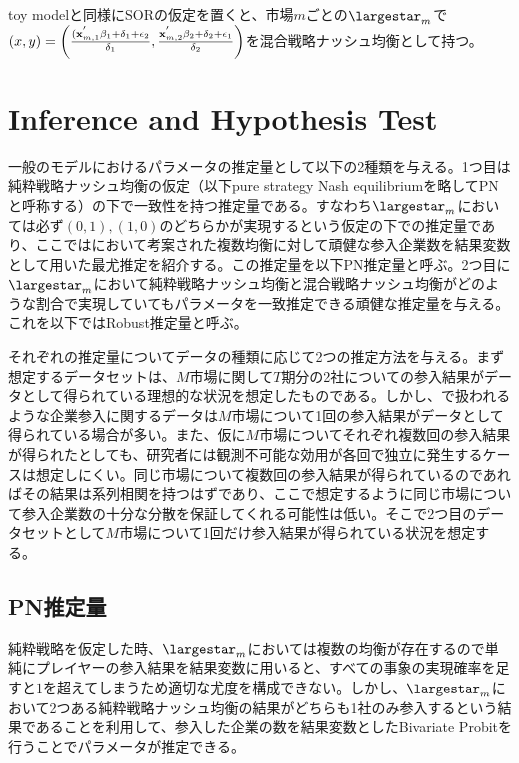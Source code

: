 \documentclass{jsarticle}
\begin{document}
toy modelと同様にSORの仮定を置くと、市場$m$ごとの$\largestar_m$で$(x, y) = \left( \frac{({\bf x}_{m, 1}^{'} \beta_1 + \delta_1 + \epsilon_2}{\delta_1} ,  \frac{{\bf x}_{m, 2}^{'} \beta_2 + \delta_2 + \epsilon_1}{\delta_2} \right)$を混合戦略ナッシュ均衡として持つ。


\section{Inference and Hypothesis Test}
一般のモデルにおけるパラメータの推定量として以下の2種類を与える。1つ目は純粋戦略ナッシュ均衡の仮定（以下pure strategy Nash equilibriumを略してPNと呼称する）の下で一致性を持つ推定量である。すなわち$\largestar_m$においては必ず$(0,1), (1,0)$のどちらかが実現するという仮定の下での推定量であり、ここでは\cite{Bresnahan1991}において考案された複数均衡に対して頑健な参入企業数を結果変数として用いた最尤推定を紹介する。この推定量を以下PN推定量と呼ぶ。2つ目に$\largestar_m$において純粋戦略ナッシュ均衡と混合戦略ナッシュ均衡がどのような割合で実現していてもパラメータを一致推定できる頑健な推定量を与える。これを以下ではRobust推定量と呼ぶ。

それぞれの推定量についてデータの種類に応じて2つの推定方法を与える。まず想定するデータセットは、$M$市場に関して$T$期分の2社についての参入結果がデータとして得られている理想的な状況を想定したものである。しかし、\cite{Ciliberto2009a}で扱われるような企業参入に関するデータは$M$市場について1回の参入結果がデータとして得られている場合が多い。また、仮に$M$市場についてそれぞれ複数回の参入結果が得られたとしても、研究者には観測不可能な効用が各回で独立に発生するケースは想定しにくい。同じ市場について複数回の参入結果が得られているのであればその結果は系列相関を持つはずであり、ここで想定するように同じ市場について参入企業数の十分な分散を保証してくれる可能性は低い。そこで2つ目のデータセットとして$M$市場について1回だけ参入結果が得られている状況を想定する。

\subsection{PN推定量}
純粋戦略を仮定した時、$\largestar_m$においては複数の均衡が存在するので単純にプレイヤーの参入結果を結果変数に用いると、すべての事象の実現確率を足すと$1$を超えてしまうため適切な尤度を構成できない。しかし、$\largestar_m$において2つある純粋戦略ナッシュ均衡の結果がどちらも1社のみ参入するという結果であることを利用して、参入した企業の数を結果変数としたBivariate Probitを行うことでパラメータが推定できる。
\end{document}
